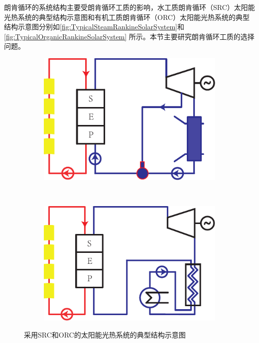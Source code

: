 朗肯循环的系统结构主要受朗肯循环工质的影响，水工质朗肯循环（SRC）太阳能光热系统的典型结构示意图和有机工质朗肯循环（ORC）太阳能光热系统的典型结构示意图分别如\autoref{fig:TypicalSteamRankineSolarSystem}和\autoref{fig:TypicalOrganicRankineSolarSystem}
所示。本节主要研究朗肯循环工质的选择问题。

\noindent \begin{figure}[htbp]
\centering
	\begin{subfigure}[b]{0.4\columnwidth}
	\includegraphics[width = \columnwidth]{fig/TypicalSteamRankineSolarSystem}
	\caption{}\label{fig:TypicalSteamRankineSolarSystem}
	\end{subfigure}
	~
\begin{subfigure}[b]{0.4\columnwidth}
	\includegraphics[width = \columnwidth]{fig/TypicalOrganicRankineSolarSystem}
	\caption{}\label{fig:TypicalOrganicRankineSolarSystem}
	\end{subfigure}
	\caption{采用SRC和ORC的太阳能光热系统的典型结构示意图}
	\label{fig:TwoTypesOfRankineCycle}
\end{figure}


